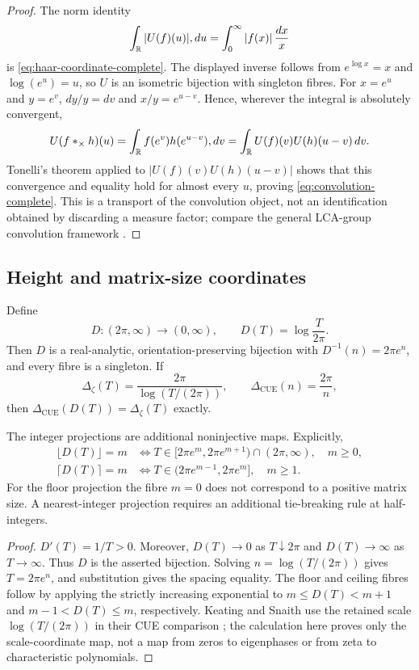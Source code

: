 \begin{proof}
The norm identity
\[
 \int_\mathbb R|U(f)(u)|,du
 =\int_0^\infty|f(x)|\,\frac{dx}{x}
\]
is \eqref{eq:haar-coordinate-complete}.  The displayed inverse follows from
$e^{\log x}=x$ and $\log(e^u)=u$, so $U$ is an isometric bijection with
singleton fibres.  For $x=e^u$ and $y=e^v$, $dy/y=dv$ and
$x/y=e^{u-v}$.  Hence, wherever the integral is absolutely convergent,
\[
 U(f*_{\times}h)(u)
 =\int_\mathbb R f(e^v)h(e^{u-v}),dv
 =\int_\mathbb R U(f)(v)U(h)(u-v)\,dv.
\]
Tonelli's theorem applied to
$|U(f)(v)U(h)(u-v)|$ shows that this convergence and equality hold for almost
every $u$, proving \eqref{eq:convolution-complete}.  This is a transport of the
convolution object, not an identification obtained by discarding a measure
factor; compare the general LCA-group convolution framework
\cite[Sec.~1.1]{rudin1990}.
\end{proof}

\subsection{Height and matrix-size coordinates}

\begin{theorem}
\label{thm:ks-density-coordinate-complete}
Define
\[
 D:(2\pi,\infty)\longrightarrow(0,\infty),
 \qquad D(T)=\log\frac{T}{2\pi}.
\]
Then $D$ is a real-analytic, orientation-preserving bijection with
$D^{-1}(n)=2\pi e^n$, and every fibre is a singleton.  If
\[
 \Delta_\zeta(T)=\frac{2\pi}{\log(T/(2\pi))},
 \qquad \Delta_{\mathrm{CUE}}(n)=\frac{2\pi}{n},
\]
then $\Delta_{\mathrm{CUE}}(D(T))=\Delta_\zeta(T)$ exactly.

The integer projections are additional noninjective maps.  Explicitly,
\begin{align*}
 \lfloor D(T)\rfloor=m
 &\Longleftrightarrow
 T\in[2\pi e^m,2\pi e^{m+1})\cap(2\pi,\infty),\quad m\geq0,\\
 \lceil D(T)\rceil=m
 &\Longleftrightarrow
 T\in(2\pi e^{m-1},2\pi e^m],\quad m\geq1.
\end{align*}
For the floor projection the fibre $m=0$ does not correspond to a positive
matrix size.  A nearest-integer projection requires an additional tie-breaking
rule at half-integers.
\end{theorem}

\begin{proof}
$D'(T)=1/T>0$.  Moreover,
$D(T)\to0$ as $T\downarrow2\pi$ and $D(T)\to\infty$ as $T\to\infty$.
Thus $D$ is the asserted bijection.  Solving $n=\log(T/(2\pi))$ gives
$T=2\pi e^n$, and substitution gives the spacing equality.  The floor and
ceiling fibres follow by applying the strictly increasing exponential to
$m\leq D(T)<m+1$ and $m-1<D(T)\leq m$, respectively.  Keating and Snaith use
the retained scale $\log(T/(2\pi))$ in their CUE comparison
\cite[eqs.~(8) and~(92)]{keatingSnaith2000}; the calculation here proves only
the scale-coordinate map, not a map from zeros to eigenphases or from zeta to
characteristic polynomials.
\end{proof}

